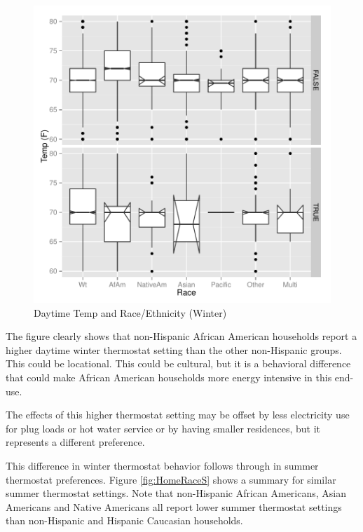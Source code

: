 \documentclass{article}
\begin{document}
\begin{figure}
\begin{center}
\caption{Daytime Temp and Race/Ethnicity (Winter)}
\label{fig:TempHomeRace}
\includegraphics{DraftEdwardsWoods-012}
\end{center}
\end{figure}

The figure clearly shows that non-Hispanic African American households report a higher daytime winter thermostat setting than the other non-Hispanic groups.  This could be locational.  This could be cultural, but it is a behavioral difference that could make African American households more energy intensive in this end-use.

The effects of this higher thermostat setting may be offset by less electricity use for plug loads or hot water service or by having smaller residences, but it represents a different preference.

This difference in winter thermostat behavior follows through in summer thermostat preferences.  Figure \ref{fig:HomeRaceS} shows a summary for similar summer thermostat settings.  Note that non-Hispanic African Americans, Asian Americans and Native Americans all report lower summer thermostat settings than non-Hispanic and Hispanic Caucasian households.
\end{document}
